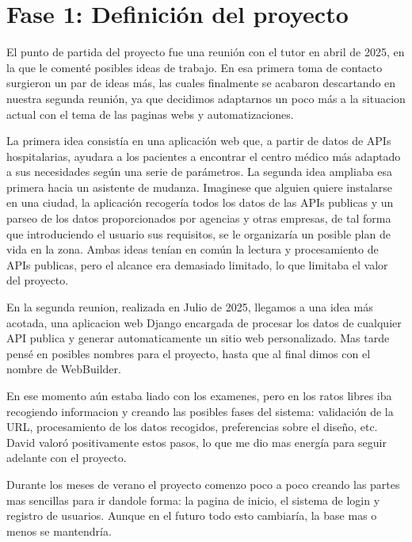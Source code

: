 \section{Fase 1: Definición del proyecto}
\label{sec:definicion-proyecto}

El punto de partida del proyecto fue una reunión con el tutor en abril de 2025, en la que le comenté posibles ideas de trabajo.
En esa primera toma de contacto surgieron un par de ideas más, las cuales finalmente se acabaron descartando en nuestra segunda reunión,
ya que decidimos adaptarnos un poco más a la situacion actual con el tema de las paginas webs y automatizaciones.


La primera idea consistía en una aplicación web que, a partir de datos de APIs hospitalarias, ayudara a los pacientes a encontrar el centro 
médico más adaptado a sus necesidades según una serie de parámetros. 
La segunda idea ampliaba esa primera hacia un asistente de mudanza. Imaginese que alguien quiere instalarse en una ciudad, la aplicación
recogería todos los datos de las APIs publicas y un parseo de los datos proporcionados por agencias y otras empresas, de tal forma que 
introduciendo el usuario sus requisitos, se le organizaría un posible plan de vida en la zona.
Ambas ideas tenían en común la lectura y procesamiento de APIs publicas, pero el alcance era demasiado limitado, lo que limitaba el valor del 
proyecto. 


En la segunda reunion, realizada en Julio de 2025, llegamos a una idea más acotada, una aplicacion web Django encargada de procesar los datos
de cualquier API publica y generar automaticamente un sitio web personalizado. Mas tarde pensé en posibles nombres para el proyecto, hasta que 
al final dimos con el nombre de WebBuilder.


En ese momento aún estaba liado con los examenes, pero en los ratos libres iba recogiendo informacion y creando las posibles fases del sistema:
validación de la URL, procesamiento de los datos recogidos, preferencias sobre el diseño, etc. David valoró positivamente estos pasos, lo que 
me dio mas energía para seguir adelante con el proyecto.


Durante los meses de verano el proyecto comenzo poco a poco creando las partes mas sencillas para ir dandole forma: la pagina de inicio, el 
sistema de login y registro de usuarios. Aunque en el futuro todo esto cambiaría, la base mas  o menos se mantendría.


